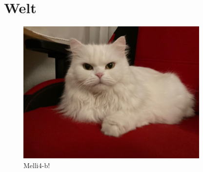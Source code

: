 \documentclass[12pt,ngerman,parskip=full]{scrreprt}
\begin{document}
\blindtext[2]

\chapter{Welt}

\begin{figure}[b!]\centering
\includegraphics[width=0.85\textwidth]{Images/Katze}
\caption{Melli4-b!}
\end{figure}

\blindtext[3]

\blindtext[2]
\end{document}
